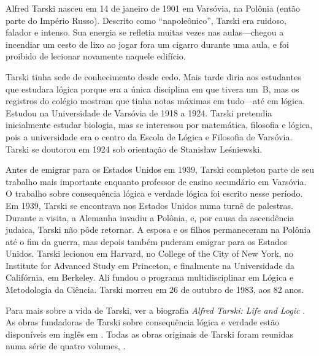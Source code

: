 \documentclass[../../../include/open-logic-section]{subfiles}
\begin{document}



Alfred Tarski nasceu em 14 de janeiro de 1901 em Varsóvia, na Polônia
(então parte do Império Russo). Descrito como ``napoleônico'', Tarski
era ruidoso, falador e intenso.  Sua energia se refletia muitas
vezes nas aulas---chegou a incendiar um cesto de lixo ao jogar fora
um cigarro durante uma aula, e foi proibido de lecionar novamente naquele
edifício.

Tarski tinha sede de conhecimento desde cedo. Mais tarde diria aos
estudantes que estudara lógica porque era a única disciplina em que
tivera um~B, mas os registros do colégio mostram que tinha notas
máximas em tudo---até em lógica. Estudou na Universidade de Varsóvia
de 1918 a 1924. Tarski pretendia inicialmente estudar biologia, mas
se interessou por matemática, filosofia e lógica, pois a universidade
era o centro da Escola de Lógica e Filosofia de Varsóvia. Tarski
se doutorou em 1924 sob orientação de Stanis\l{}aw Le\'{s}niewski.

Antes de emigrar para os Estados Unidos em 1939, Tarski completou
parte de seu trabalho mais importante enquanto professor de ensino
secundário em Varsóvia. O trabalho sobre consequência lógica e
verdade lógica foi escrito nesse período. Em 1939, Tarski se encontrava
nos Estados Unidos numa turnê de palestras. Durante a visita,
a Alemanha invadiu a Polônia, e, por causa da ascendência judaica,
Tarski não pôde retornar.  A esposa e os filhos permaneceram na
Polônia até o fim da guerra, mas depois também puderam emigrar para
os Estados Unidos.  Tarski lecionou em Harvard, no College of the City
of New York, no Institute for Advanced Study em Princeton, e
finalmente na Universidade da Califórnia, em Berkeley. Ali fundou o
programa multidisciplinar em Lógica e Metodologia da Ciência.  Tarski
morreu em 26 de outubro de 1983, aos 82 anos.

\begin{reading} 
Para mais sobre a vida de Tarski, ver a biografia \emph{Alfred Tarski:
  Life and Logic} \citep{Feferman2004}. As obras fundadoras de Tarski
sobre consequência lógica e verdade estão disponíveis em inglês em
\citep{Tarski1983}. Todas as obras originais de Tarski foram reunidas
numa série de quatro volumes, \citep{Tarski1981}.
\end{reading}
\end{document}

